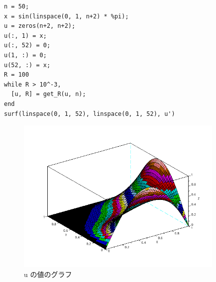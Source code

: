 \documentclass[a4j, 11pt]{jarticle}
\begin{document}
\begin{verbatim}
n = 50;
x = sin(linspace(0, 1, n+2) * %pi);
u = zeros(n+2, n+2);
u(:, 1) = x;
u(:, 52) = 0;
u(1, :) = 0;
u(52, :) = x;
R = 100
while R > 10^-3,
  [u, R] = get_R(u, n);
end
surf(linspace(0, 1, 52), linspace(0, 1, 52), u')   
\end{verbatim}
\begin{figure}[htbp]
\centering
\includegraphics[width=10cm]{./2-1.png}
\caption{u の値のグラフ}
\end{figure}
\end{document}
